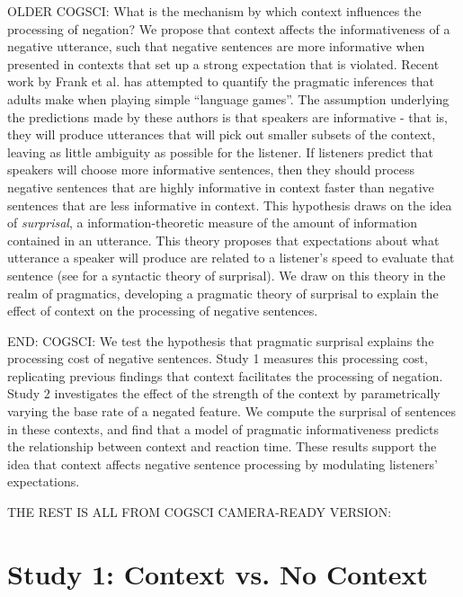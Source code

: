 \documentclass[man]{apa2}
\begin{document}
OLDER COGSCI:
What is the mechanism by which context influences the processing of negation?  We propose that context affects the informativeness of a negative utterance, such that negative sentences are more informative when presented in contexts that set up a strong expectation that is violated.  Recent work by Frank et al. \cite{frank2012} has attempted to quantify the pragmatic inferences that adults make when playing simple ``language games''. The assumption underlying the predictions made by these authors is that speakers are informative - that is, they will produce utterances that will pick out smaller subsets of the context, leaving as little ambiguity as possible for the listener.  If listeners predict that speakers will choose more informative sentences, then they should process negative sentences that are highly informative in context faster than negative sentences that are less informative in context.  This hypothesis draws on the idea of \emph{surprisal}, a information-theoretic measure of the amount of information contained in an utterance.  This theory proposes that expectations about what utterance a speaker will produce are related to a listener's speed to evaluate that sentence  (see for a syntactic theory of surprisal).  We draw on this theory in the realm of pragmatics, developing a pragmatic theory of surprisal to explain the effect of context on the processing of negative sentences.  









END:
COGSCI:
We test the hypothesis that pragmatic surprisal explains the processing cost of negative sentences. Study 1 measures this processing cost, replicating previous findings that context facilitates the processing of negation.  Study 2 investigates the effect of the strength of the context by parametrically varying the base rate of a negated feature.  We compute the surprisal of sentences in these contexts, and find that a model of pragmatic informativeness predicts the relationship between context and reaction time.  These results support the idea that context affects negative sentence processing by modulating listeners' expectations. 





THE REST IS ALL FROM COGSCI CAMERA-READY VERSION:

\section{Study 1: Context vs. No Context}
\end{document}
